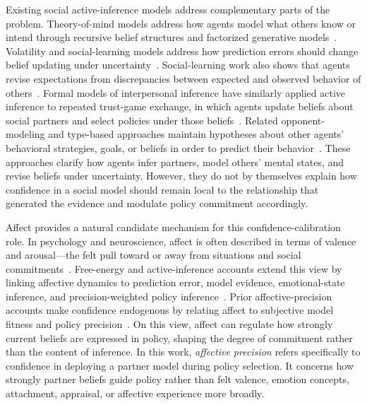 Existing social active-inference models address complementary parts of the problem. Theory-of-mind models address how agents model what others know or intend through recursive belief structures and factorized generative models~\cite{Pitliya2025ToMActiveInference,RuizSerra2025Factorised}. Volatility and social-learning models address how prediction errors should change belief updating under uncertainty~\cite{Behrens2008SocialLearning,Diaconescu2017Hierarchical,Mathys2011HGF}. Social-learning work also shows that agents revise expectations from discrepancies between expected and observed behavior of others~\cite{joiner2017social}. Formal models of interpersonal inference have similarly applied active inference to repeated trust-game exchange, in which agents update beliefs about social partners and select policies under those beliefs~\cite{Moutoussis2014InterpersonalInference}. Related opponent-modeling and type-based approaches maintain hypotheses about other agents' behavioral strategies, goals, or beliefs in order to predict their behavior~\cite{AlbrechtStone2018ModellingAgents}. These approaches clarify how agents infer partners, model others' mental states, and revise beliefs under uncertainty. However, they do not by themselves explain how confidence in a social model should remain local to the relationship that generated the evidence and modulate policy commitment accordingly.

Affect provides a natural candidate mechanism for this confidence-calibration role. In psychology and neuroscience, affect is often described in terms of valence and arousal---the felt pull toward or away from situations and social commitments~\cite{Barrett2006EmotionParadox}. Free-energy and active-inference accounts extend this view by linking affective dynamics to prediction error, model evidence, emotional-state inference, and precision-weighted policy inference~\cite{Hesp2021DeeplyFeltAffect,joffily2013emotional,pattisapu2024free,smith2019simulating}. Prior affective-precision accounts make confidence endogenous by relating affect to subjective model fitness and policy precision~\cite{Hesp2021DeeplyFeltAffect}. On this view, affect can regulate how strongly current beliefs are expressed in policy, shaping the degree of commitment rather than the content of inference. In this work, \emph{affective precision} refers specifically to confidence in deploying a partner model during policy selection. It concerns how strongly partner beliefs guide policy rather than felt valence, emotion concepts, attachment, appraisal, or affective experience more broadly.

